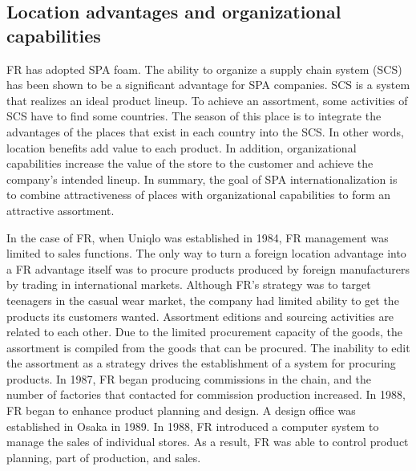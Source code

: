 \documentclass[12pt,a4paper]{article}
\begin{document}
\hypertarget{location-advantages-and-organizational-capabilities}{%
\subsection{Location advantages and organizational
capabilities}\label{location-advantages-and-organizational-capabilities}}

FR has adopted SPA foam. The ability to organize a supply chain system
(SCS) has been shown to be a significant advantage for SPA companies.
SCS is a system that realizes an ideal product lineup. To achieve an
assortment, some activities of SCS have to find some countries. The
season of this place is to integrate the advantages of the places that
exist in each country into the SCS. In other words, location benefits
add value to each product. In addition, organizational capabilities
increase the value of the store to the customer and achieve the
company's intended lineup. In summary, the goal of SPA
internationalization is to combine attractiveness of places with
organizational capabilities to form an attractive assortment.

In the case of FR, when Uniqlo was established in 1984, FR management
was limited to sales functions. The only way to turn a foreign location
advantage into a FR advantage itself was to procure products produced by
foreign manufacturers by trading in international markets. Although FR's
strategy was to target teenagers in the casual wear market, the company
had limited ability to get the products its customers wanted. Assortment
editions and sourcing activities are related to each other. Due to the
limited procurement capacity of the goods, the assortment is compiled
from the goods that can be procured. The inability to edit the
assortment as a strategy drives the establishment of a system for
procuring products. In 1987, FR began producing commissions in the
chain, and the number of factories that contacted for commission
production increased. In 1988, FR began to enhance product planning and
design. A design office was established in Osaka in 1989. In 1988, FR
introduced a computer system to manage the sales of individual stores.
As a result, FR was able to control product planning, part of
production, and sales.
\end{document}

